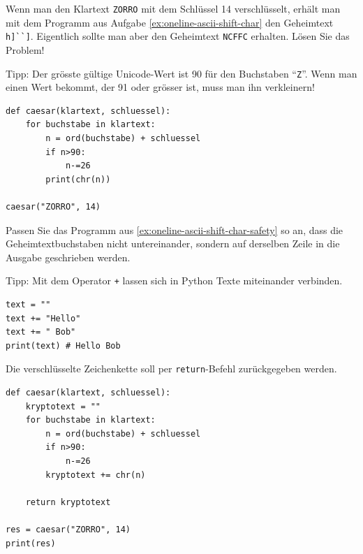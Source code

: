\begin{myexercise}\label{ex:oneline-ascii-shift-char-safety}
Wenn man den Klartext \texttt{ZORRO} mit dem Schlüssel 14 verschlüsselt, erhält man mit dem Programm aus Aufgabe \cref{ex:oneline-ascii-shift-char} den Geheimtext \lstinline|h]``]|. Eigentlich sollte man aber den Geheimtext \texttt{NCFFC} erhalten. Lösen Sie das Problem!

Tipp: Der grösste gültige Unicode-Wert ist 90 für den Buchstaben ``\texttt{Z}''. Wenn man einen Wert bekommt, der 91 oder grösser ist, muss man ihn verkleinern!

\begin{myanswer}
\begin{lstlisting}
def caesar(klartext, schluessel):
    for buchstabe in klartext:
        n = ord(buchstabe) + schluessel
        if n>90:
            n-=26
        print(chr(n))

caesar("ZORRO", 14)
\end{lstlisting}
\end{myanswer}


\end{myexercise}

\begin{myexercise}\label{ex:oneline-ascii-shift-char-safety-final}
Passen Sie das Programm aus \cref{ex:oneline-ascii-shift-char-safety} so an, dass die Geheimtextbuchstaben nicht untereinander, sondern auf derselben Zeile in die Ausgabe geschrieben werden.

Tipp: Mit dem Operator \texttt{+} lassen sich in Python Texte miteinander verbinden.

\begin{lstlisting}
text = ""
text += "Hello"
text += " Bob"
print(text) # Hello Bob
\end{lstlisting}

Die verschlüsselte Zeichenkette soll per \lstinline|return|-Befehl zurückgegeben werden.

\begin{myanswer}
\begin{lstlisting}
def caesar(klartext, schluessel):
    kryptotext = ""
    for buchstabe in klartext:
        n = ord(buchstabe) + schluessel
        if n>90:
            n-=26
        kryptotext += chr(n)
        
    return kryptotext

res = caesar("ZORRO", 14)
print(res)
\end{lstlisting}
\end{myanswer}
\end{myexercise}

